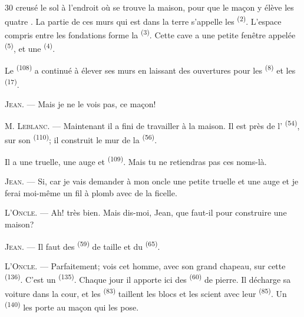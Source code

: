 \begin{VUpage}[32]{30}
\VUcontinue
creusé le sol à l'endroit où se trouve la maison, pour\nl
que le maçon y élève les quatre . La partie de\nl
ces murs qui est dans la terre s'appelle les \cc
{} \textsuperscript{(2)}. L'espace compris entre les fondations forme\nl
la  \textsuperscript{(3)}. Cette cave a une petite fenêtre appelée\nl
{} \textsuperscript{(5)}, et une  \textsuperscript{(4)}.

\VUblancAlinea
Le  \textsuperscript{(108)} a continué à élever ses murs en\nl
laissant des ouvertures pour les  \textsuperscript{(8)} et les\nl
{} \textsuperscript{(17)}.

\VUblancAlinea
\textsc{Jean}. --- Mais je ne le vois pas, ce maçon!

\VUblancAlinea
\textsc{M. Leblanc}. --- Maintenant il a fini de travailler\nl
à la maison. Il est près de l' \textsuperscript{(54)}, sur son \cc
{} \textsuperscript{(110)}; il construit le mur de la  \textsuperscript{(56)}.

\VUblancAlinea
Il a une truelle, une auge et  \textsuperscript{(109)}.\nl
Mais tu ne retiendras pas ces noms-là.

\VUblancAlinea
\textsc{Jean}. --- Si, car je vais demander à mon oncle une\nl
petite truelle et une auge et je ferai moi-même un fil\nl
à plomb avec de la ficelle.

\VUblancAlinea
\textsc{L'Oncle}. --- Ah! très bien. Mais dis-moi, Jean,\nl
que faut-il pour construire une maison?

\VUblancAlinea
\textsc{Jean}. --- Il faut des  \textsuperscript{(59)} de taille et du\nl
{} \textsuperscript{(65)}.

\VUblancAlinea
\textsc{L'Oncle}. --- Parfaitement; vois cet homme, avec\nl
son grand chapeau, sur cette  \textsuperscript{(136)}. C'est\nl
un  \textsuperscript{(135)}. Chaque jour il apporte ici des\nl
{} \textsuperscript{(60)} de pierre. Il décharge sa voiture dans\nl
la cour, et les  \textsuperscript{(83)} taillent les\nl
blocs et les scient avec leur  \textsuperscript{(85)}. Un\nl
{} \textsuperscript{(140)} les porte au maçon qui les pose.


\end{VUpage}
